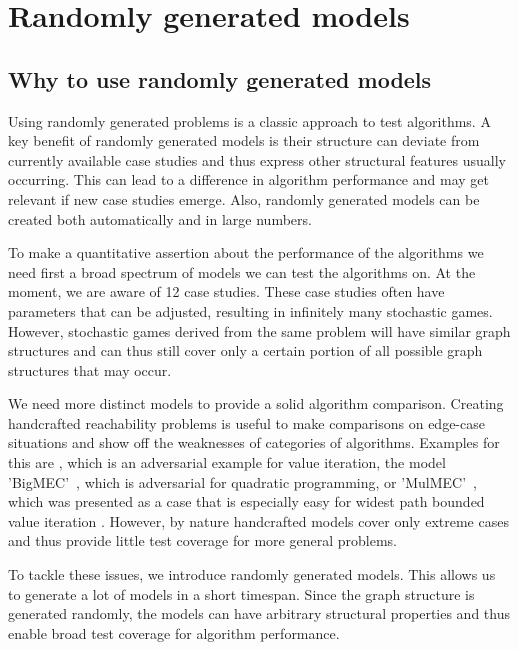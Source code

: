\chapter{Randomly generated models} \label{ch:randomGen}
\section{Why to use randomly generated models}
Using randomly generated problems is a classic approach to test algorithms.
A key benefit of randomly generated models is their structure can deviate from currently available case studies 
and thus express other structural features usually occurring. 
This can lead to a difference in algorithm performance and may get relevant if new case studies emerge.
Also, randomly generated models can be created both automatically and in large numbers.

To make a quantitative assertion about the performance of the algorithms we need first a broad spectrum of models we can test the algorithms on.
At the moment, we are aware of 12 case studies.
These case studies often have parameters that can be adjusted, resulting in infinitely many stochastic games.
However, stochastic games derived from the same problem will have similar graph structures and can thus still cover only a certain portion
of all possible graph structures that may occur.

We need more distinct models to provide a solid algorithm comparison.
Creating handcrafted reachability problems is useful to make comparisons on edge-case situations and 
show off the weaknesses of categories of algorithms. Examples for this are \cite{haddadmonmege}, which is an adversarial example for
value iteration, the model 'BigMEC'~\cite{gandalf}, which is adversarial for quadratic programming, or 'MulMEC'~\cite{gandalf}, which was presented as
a case that is especially easy for widest path bounded value iteration \cite{widestPath}.
However, by nature handcrafted models cover only extreme cases and thus provide little test coverage for more general problems.

To tackle these issues, we introduce randomly generated models. 
This allows us to generate a lot of models in a short timespan.
Since the graph structure is generated randomly, 
the models can have arbitrary structural properties and thus enable broad test coverage for algorithm performance.


